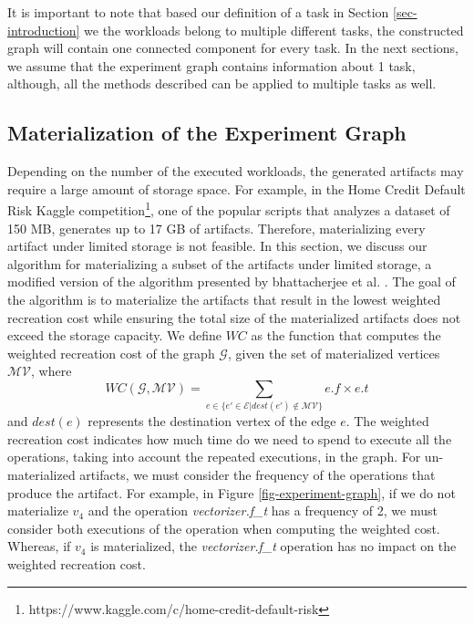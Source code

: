 It is important to note that based our definition of a task in Section \ref{sec-introduction} we the workloads belong to multiple different tasks, the constructed graph will contain one connected component for every task.
In the next sections, we assume that the experiment graph contains information about 1 task, although, all the methods described can be applied to multiple tasks as well.

\subsection{Materialization of the Experiment Graph}\label{subsec-materialization}
Depending on the number of the executed workloads, the generated artifacts may require a large amount of storage space.
For example, in the Home Credit Default Risk Kaggle competition\footnote{https://www.kaggle.com/c/home-credit-default-risk}, one of the popular scripts that analyzes a dataset of 150 MB, generates up to 17 GB of artifacts.
Therefore, materializing every artifact under limited storage is not feasible.
In this section, we discuss our algorithm for materializing a subset of the artifacts under limited storage, a modified version of the algorithm presented by bhattacherjee et al. \cite{bhattacherjee2015principles}.
The goal of the algorithm is to materialize the artifacts that result in the lowest weighted recreation cost while ensuring the total size of the materialized artifacts does not exceed the storage capacity.
We define $WC$ as the function that computes the weighted recreation cost of the graph $\mathcal{G}$, given the set of materialized vertices $\mathcal{MV}$, where  
\[
WC(\mathcal{G}, \mathcal{MV}) =  \sum\limits_{e \in \{e' \in \mathcal{E}  \lvert dest(e') \notin \mathcal{MV}\}}  e.f \times e.t
\]
and $dest(e)$ represents the destination vertex of the edge $e$.
The weighted recreation cost indicates how much time do we need to spend to execute all the operations, taking into account the repeated executions, in the graph.
For un-materialized artifacts, we must consider the frequency of the operations that produce the artifact.
For example, in Figure \ref{fig-experiment-graph}, if we do not materialize $v_4$ and the operation \textit{vectorizer.f\_t} has a frequency of 2, we must consider both executions of the operation when computing the weighted cost.
Whereas, if $v_4$ is materialized, the \textit{vectorizer.f\_t} operation has no impact on the weighted recreation cost.


